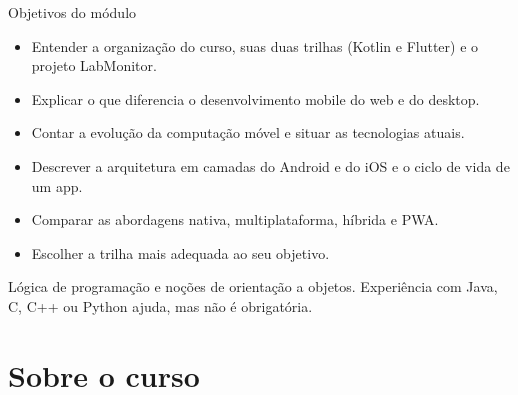 \documentclass[aspectratio=169,10pt]{beamer}
\begin{document}
\capa

\begin{frame}{Objetivos do módulo}
  \begin{conceito}
    \begin{itemize}
      \item Entender a organização do curso, suas duas trilhas (Kotlin e Flutter) e o projeto LabMonitor.
      \item Explicar o que diferencia o desenvolvimento mobile do web e do desktop.
      \item Contar a evolução da computação móvel e situar as tecnologias atuais.
      \item Descrever a arquitetura em camadas do Android e do iOS e o ciclo de vida de um app.
      \item Comparar as abordagens nativa, multiplataforma, híbrida e PWA.
      \item Escolher a trilha mais adequada ao seu objetivo.
    \end{itemize}
  \end{conceito}
  \begin{dica}
    Lógica de programação e noções de orientação a objetos. Experiência com Java, C, C++ ou Python ajuda, mas não é obrigatória.
  \end{dica}
\end{frame}

\sumario

\section{Sobre o curso}
\end{document}
